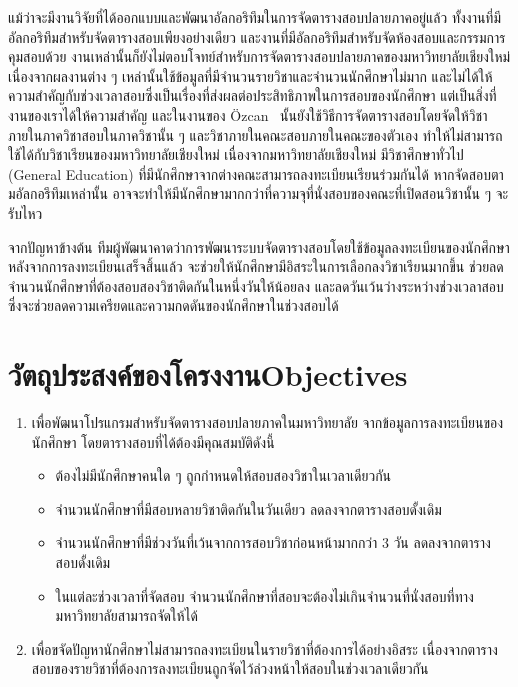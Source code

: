 แม้ว่าจะมีงานวิจัยที่ได้ออกแบบและพัฒนาอัลกอริทึมในการจัดตารางสอบปลายภาคอยู่แล้ว \cite{graphcl-constr-manip,graphcl-2008,fes,graphcl-alter-approach,graphcl-idepset} 
ทั้งงานที่มีอัลกอริทึมสำหรับจัดตารางสอบเพียงอย่างเดียว และงานที่มีอัลกอริทึมสำหรับจัดห้องสอบและกรรมการคุมสอบด้วย
งานเหล่านั้นก็ยังไม่ตอบโจทย์สำหรับการจัดตารางสอบปลายภาคของมหาวิทยาลัยเชียงใหม่ 
เนื่องจากผลงานต่าง ๆ เหล่านั้นใช้ข้อมูลที่มีจำนวนรายวิชาและจำนวนนักศึกษาไม่มาก และไม่ได้ให้ความสำคัญกับช่วงเวลาสอบซึ่งเป็นเรื่องที่ส่งผลต่อประสิทธิภาพในการสอบของนักศึกษา 
แต่เป็นสิ่งที่งานของเราได้ให้ความสำคัญ และในงานของ {\"O}zcan~\cite{fes} นั้นยังใช้วิธีการจัดตารางสอบโดยจัดให้วิชาภายในภาควิชาสอบในภาควิชานั้น ๆ และวิชาภายในคณะสอบภายในคณะของตัวเอง
ทำให้ไม่สามารถใช้ได้กับวิชาเรียนของมหาวิทยาลัยเชียงใหม่ เนื่องจากมหาวิทยาลัยเชียงใหม่ มีวิชาศึกษาทั่วไป (General Education) ที่มีนักศึกษาจากต่างคณะสามารถลงทะเบียนเรียนร่วมกันได้ หากจัดสอบตามอัลกอรึทึมเหล่านั้น อาจจะทำให้มีนักศึกษามากกว่าที่ความจุที่นั่งสอบของคณะที่เปิดสอนวิชานั้น ๆ จะรับไหว

จากปัญหาข้างต้น ทีมผู้พัฒนาคาดว่าการพัฒนาระบบจัดตารางสอบโดยใช้ข้อมูลลงทะเบียนของนักศึกษา หลังจากการลงทะเบียนเสร็จสิ้นแล้ว 
จะช่วยให้นักศึกษามีอิสระในการเลือกลงวิชาเรียนมากขึ้น ช่วยลดจำนวนนักศึกษาที่ต้องสอบสองวิชาติดกันในหนึ่งวันให้น้อยลง และลดวันเว้นว่างระหว่างช่วงเวลาสอบ
ซึ่งจะช่วยลดความเครียดและความกดดันของนักศึกษาในช่วงสอบได้

\section{\ifcpe วัตถุประสงค์ของโครงงาน\else Objectives\fi}
\label{sec:Objectives}
\begin{enumerate}
    \item เพื่อพัฒนาโปรแกรมสำหรับจัดตารางสอบปลายภาคในมหาวิทยาลัย จากข้อมูลการลงทะเบียนของนักศึกษา โดยตารางสอบที่ได้ต้องมีคุณสมบัติดังนี้
    \begin{itemize}
        \item ต้องไม่มีนักศึกษาคนใด ๆ ถูกกำหนดให้สอบสองวิชาในเวลาเดียวกัน
        \item จำนวนนักศึกษาที่มีสอบหลายวิชาติดกันในวันเดียว ลดลงจากตารางสอบดั้งเดิม
        \item จำนวนนักศึกษาที่มีช่วงวันที่เว้นจากการสอบวิชาก่อนหน้ามากกว่า 3 วัน ลดลงจากตารางสอบดั้งเดิม
        \item ในแต่ละช่วงเวลาที่จัดสอบ จำนวนนักศึกษาที่สอบจะต้องไม่เกินจำนวนที่นั่งสอบที่ทางมหาวิทยาลัยสามารถจัดให้ได้
    \end{itemize}
    \item เพื่อขจัดปัญหานักศึกษาไม่สามารถลงทะเบียนในรายวิชาที่ต้องการได้อย่างอิสระ เนื่องจากตารางสอบของรายวิชาที่ต้องการลงทะเบียนถูกจัดไว้ล่วงหน้าให้สอบในช่วงเวลาเดียวกัน
\end{enumerate}

